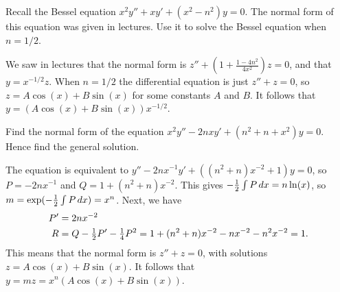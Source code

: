 \documentclass[a4paper]{amsart}
\begin{document}
\begin{exercise}\label{ex-bessel-half}
 Recall the Bessel equation $x^2y''+xy'+(x^2-n^2)y=0$.  The normal
 form of this equation was given in lectures.  Use it to solve the
 Bessel equation when $n=1/2$.
\end{exercise}
\begin{solution}
 We saw in lectures that the normal form is 
 $z''+\left(1+\frac{1-4n^2}{4x^2}\right)z=0$, and that $y=x^{-1/2}z$.
 When $n=1/2$ the differential equation is just $z''+z=0$, so
 $z=A\cos(x)+B\sin(x)$ for some constants $A$ and $B$.  It follows
 that $y=(A\cos(x)+B\sin(x))x^{-1/2}$.
\end{solution}

\begin{exercise}\label{ex-normal-b}
 Find the normal form of the equation
 $x^2y'' -2nxy' + (n^2+n+x^2)y = 0$.
 Hence find the general solution.
\end{exercise}
\begin{solution}
 The equation is equivalent to $y''-2nx^{-1}y'+((n^2+n)x^{-2}+1)y=0$,
 so $P=-2nx^{-1}$ and $Q=1+(n^2+n)x^{-2}$.  This gives
 $-\tfrac{1}{2}\int P\,dx=n\ln(x)$, so $m=\exp(-\tfrac{1}{2}\int P\,dx)=x^n$.  Next,
 we have 
 \begin{align*}
  P' &= 2nx^{-2} \\
  R &= Q - \tfrac{1}{2} P' - \tfrac{1}{4}P^2 
     = 1+(n^2+n)x^{-2} - n x^{-2} - n^2 x^{-2} = 1. 
 \end{align*}
 This means that the normal form is $z''+z=0$, with solutions
 $z=A\cos(x)+B\sin(x)$.  It follows that
 $y=mz=x^n(A\cos(x)+B\sin(x))$.  
\end{solution}
\end{document}
